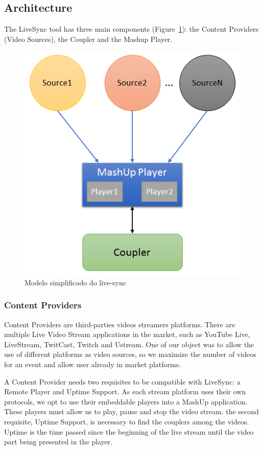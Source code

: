 \documentclass{sig-alternate-05-2015}
\begin{document}
\subsection{Architecture}
The LiveSync tool has three main components (Figure~\ref{livesync}): the Content Providers (Video Sources), the Coupler and the Mashup Player.

\begin{figure}[h]
	\centerline{\includegraphics[scale=0.6] {figure/arqchitecture}}
	\caption{Modelo simplificado do live-sync}
	\label{livesync}
\end{figure}

\subsubsection{Content Providers}
Content Providers are third-parties videos streamers platforms. There are multiple Live Video Stream applications in the market, such as YouTube Live, LiveStream, TwitCast, Twitch and Ustream. One of our object was to allow the use of different platforms as video sources, so we maximize the number of videos for an event and allow user already in market platforms. 

A Content Provider needs two requisites to be compatible with LiveSync: a Remote Player and Uptime Support. As each stream platform uses their own protocols, we opt to use their embeddable players into a MashUp application. These players must allow us to play, pause and stop the video stream. the second requisite, Uptime Support, is necessary to find the couplers among the videos. Uptime is the time passed since the beginning of the live stream until the video part being presented in the player.
\end{document}
